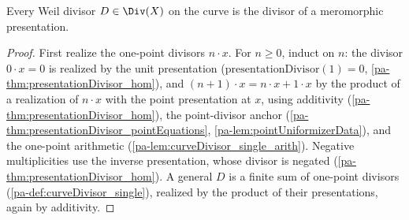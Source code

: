 \begin{theorem}
  \label{pa-thm:exists_presentationDivisor_eq}
  \leanok

  Every Weil divisor \(D \in \Div(X)\) on the curve is the divisor of a meromorphic presentation.
\end{theorem}
\begin{proof}
  \leanok
  First realize the one-point divisors \(n \cdot x\). For \(n \ge 0\), induct on \(n\): the divisor
  \(0 \cdot x = 0\) is realized by the unit presentation (\(\mathrm{presentationDivisor}(1) = 0\),
  \ref{pa-thm:presentationDivisor_hom}), and \((n+1) \cdot x = n \cdot x + 1 \cdot x\) by the product
  of a realization of \(n \cdot x\) with the point presentation at \(x\), using additivity
  (\ref{pa-thm:presentationDivisor_hom}), the point-divisor anchor
  (\ref{pa-thm:presentationDivisor_pointEquations}, \ref{pa-lem:pointUniformizerData}), and the one-point
  arithmetic (\ref{pa-lem:curveDivisor_single_arith}). Negative multiplicities use the inverse
  presentation, whose divisor is negated (\ref{pa-thm:presentationDivisor_hom}). A general \(D\) is a
  finite sum of one-point divisors (\ref{pa-def:curveDivisor_single}), realized by the product of
  their presentations, again by additivity.
\end{proof}

